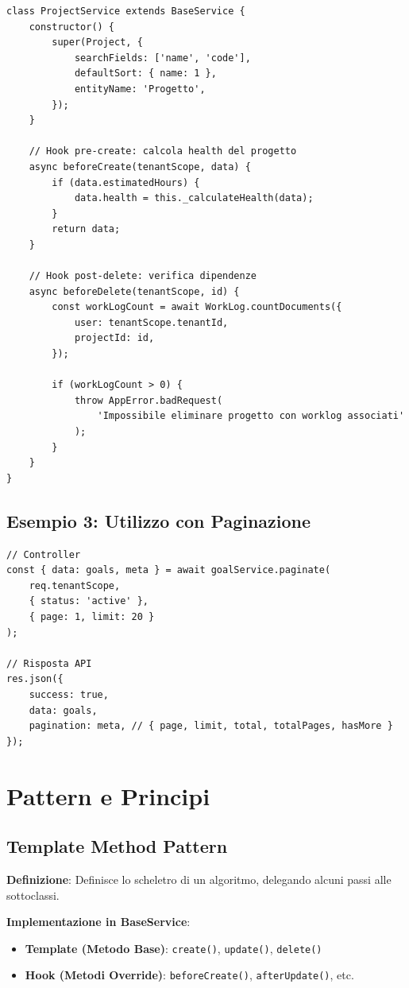 \documentclass[11pt,a4paper]{article}
\begin{document}
\begin{lstlisting}
class ProjectService extends BaseService {
    constructor() {
        super(Project, {
            searchFields: ['name', 'code'],
            defaultSort: { name: 1 },
            entityName: 'Progetto',
        });
    }
    
    // Hook pre-create: calcola health del progetto
    async beforeCreate(tenantScope, data) {
        if (data.estimatedHours) {
            data.health = this._calculateHealth(data);
        }
        return data;
    }
    
    // Hook post-delete: verifica dipendenze
    async beforeDelete(tenantScope, id) {
        const workLogCount = await WorkLog.countDocuments({
            user: tenantScope.tenantId,
            projectId: id,
        });
        
        if (workLogCount > 0) {
            throw AppError.badRequest(
                'Impossibile eliminare progetto con worklog associati'
            );
        }
    }
}
\end{lstlisting}

\subsection{Esempio 3: Utilizzo con Paginazione}

\begin{lstlisting}
// Controller
const { data: goals, meta } = await goalService.paginate(
    req.tenantScope,
    { status: 'active' },
    { page: 1, limit: 20 }
);

// Risposta API
res.json({
    success: true,
    data: goals,
    pagination: meta, // { page, limit, total, totalPages, hasMore }
});
\end{lstlisting}

\section{Pattern e Principi}

\subsection{Template Method Pattern}

\textbf{Definizione}: Definisce lo scheletro di un algoritmo, delegando alcuni passi alle sottoclassi.

\textbf{Implementazione in BaseService}:
\begin{itemize}
    \item \textbf{Template (Metodo Base)}: \texttt{create()}, \texttt{update()}, \texttt{delete()}
    \item \textbf{Hook (Metodi Override)}: \texttt{beforeCreate()}, \texttt{afterUpdate()}, etc.
\end{itemize}
\end{document}
